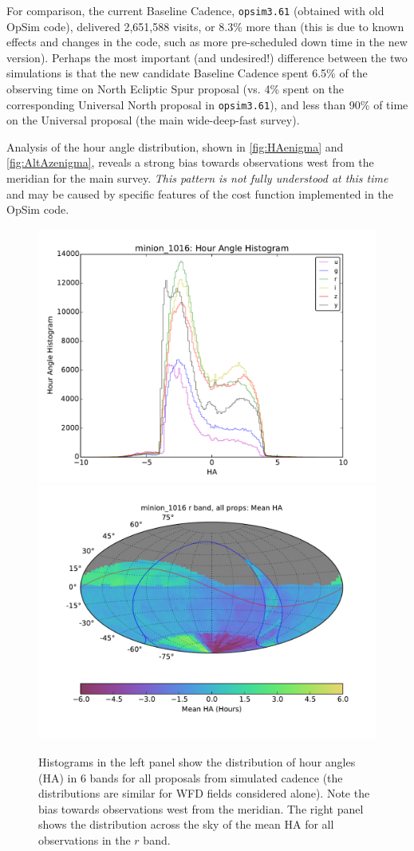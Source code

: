 For comparison, the current Baseline Cadence, \texttt{opsim3.61}
(obtained with old OpSim code), delivered 2,651,588 visits, or 8.3\%
more than   (this is due to known effects and
changes in the code,  such as more pre-scheduled down time in the new
version). Perhaps the most important (and undesired!) difference
between the two simulations is that the new candidate Baseline Cadence
spent 6.5\% of the observing time on North Ecliptic Spur proposal (vs.
4\% spent on the corresponding Universal North proposal in
\texttt{opsim3.61}), and less than 90\% of time on the Universal
proposal (the main wide-deep-fast survey).

Analysis of the hour angle distribution, shown in
\autoref{fig:HAenigma} and \autoref{fig:AltAzenigma}, reveals a strong
bias towards observations west from the meridian for the main survey.
{\it This pattern is not fully understood at this time} and may be
caused by specific features of the cost function implemented in the
OpSim code.



\begin{figure}[t!]
\vskip -0.0in
\includegraphics[angle=0,width=0.49\hsize,clip]{figs/cadence/minion_1016_Hour_Angle_Histogram_u_g_r_i_z_y_band_all_props_ONED_ComboBinnedData.pdf}
\includegraphics[angle=0,width=0.49\hsize,clip]{figs/cadence/minion_1016_Mean_HA_r_band_all_props_OPSI_SkyMap.pdf}
\vskip -0.1in
\caption{Histograms in the left panel show the distribution of hour angles (HA) in
6 bands for all proposals from simulated cadence  (the distributions are
similar for WFD fields considered alone). Note the bias towards observations west from
the meridian. The right panel shows the distribution across the sky of the mean HA for
all observations in the $r$ band. }
\label{fig:HAenigma}
\end{figure}

